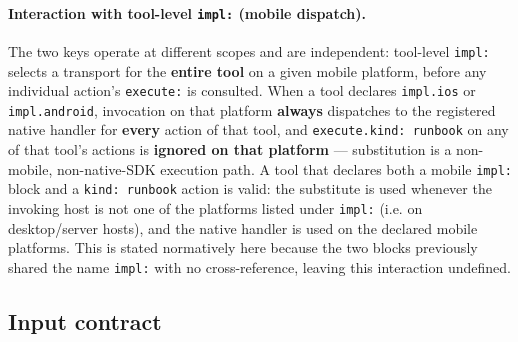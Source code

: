 \paragraph{Interaction with tool-level \texttt{impl:} (mobile dispatch).}
The two keys operate at different scopes and are independent: tool-level
\texttt{impl:} selects a transport for the \textbf{entire tool} on a given
mobile platform, before any individual action's \texttt{execute:} is
consulted. When a tool declares \texttt{impl.ios} or \texttt{impl.android},
invocation on that platform \textbf{always} dispatches to the registered
native handler for \textbf{every} action of that tool, and
\texttt{execute.kind: runbook} on any of that tool's actions is
\textbf{ignored on that platform} --- substitution is a non-mobile,
non-native-SDK execution path. A tool that declares both a mobile
\texttt{impl:} block and a \texttt{kind: runbook} action is valid: the
substitute is used whenever the invoking host is not one of the platforms
listed under \texttt{impl:} (i.e. on desktop/server hosts), and the native
handler is used on the declared mobile platforms. This is stated normatively
here because the two blocks previously shared the name \texttt{impl:} with
no cross-reference, leaving this interaction undefined.

\subsection{Input contract}

